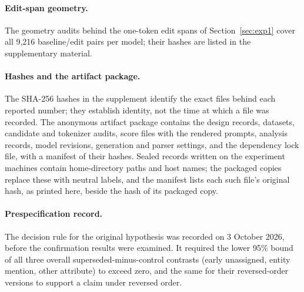 \paragraph{Edit-span geometry.} The geometry audits behind the one-token edit spans of Section~\ref{sec:exp1} cover all 9,216 baseline/edit pairs per model; their hashes are listed in the supplementary material.

\paragraph{Hashes and the artifact package.} The SHA-256 hashes in the supplement identify the exact files behind each reported number; they establish identity, not the time at which a file was recorded. The anonymous artifact package contains the design records, datasets, candidate and tokenizer audits, score files with the rendered prompts, analysis records, model revisions, generation and parser settings, and the dependency lock file, with a manifest of their hashes. Sealed records written on the experiment machines contain home-directory paths and host names; the packaged copies replace these with neutral labels, and the manifest lists each such file's original hash, as printed here, beside the hash of its packaged copy.

\paragraph{Prespecification record.} The decision rule for the original hypothesis was recorded on 3 October 2026, before the confirmation results were examined. It required the lower 95\% bound of all three overall superseded-minus-control contrasts (early unassigned, entity mention, other attribute) to exceed zero, and the same for their reversed-order versions to support a claim under reversed order.

\FloatBarrier
